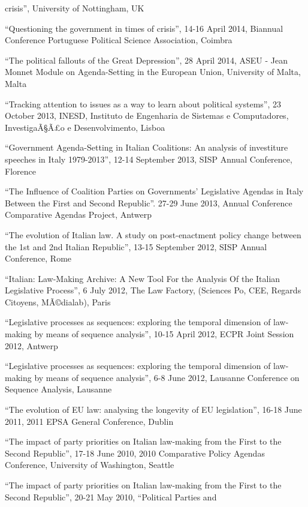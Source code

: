 \documentclass[11pt,]{article}
\renewenvironment{itemize}{
  \begin{list}{}{
    \setlength{\leftmargin}{1.5em}
  }
}{
  \end{list}
}
\begin{document}
\begin{itemize}
  crisis'', University of Nottingham, UK
\item
  ``Questioning the government in times of crisis'', 14-16 April 2014,
  Biannual Conference Portuguese Political Science Association, Coimbra
\item
  ``The political fallouts of the Great Depression'', 28 April 2014,
  ASEU - Jean Monnet Module on Agenda-Setting in the European Union,
  University of Malta, Malta
\item
  ``Tracking attention to issues as a way to learn about political
  systems'', 23 October 2013, INESD, Instituto de Engenharia de Sistemas
  e Computadores, InvestigaÃ§Ã£o e Desenvolvimento, Lisboa
\item
  ``Government Agenda-Setting in Italian Coalitions: An analysis of
  investiture speeches in Italy 1979-2013'', 12-14 September 2013, SISP
  Annual Conference, Florence
\item
  ``The Influence of Coalition Parties on Governments' Legislative
  Agendas in Italy Between the First and Second Republic''. 27-29 June
  2013, Annual Conference Comparative Agendas Project, Antwerp
\item
  ``The evolution of Italian law. A study on post-enactment policy
  change between the 1st and 2nd Italian Republic'', 13-15 September
  2012, SISP Annual Conference, Rome
\item
  ``Italian: Law-Making Archive: A New Tool For the Analysis Of the
  Italian Legislative Process'', 6 July 2012, The Law Factory, (Sciences
  Po, CEE, Regards Citoyens, MÃ©dialab), Paris
\item
  ``Legislative processes as sequences: exploring the temporal dimension
  of law-making by means of sequence analysis'', 10-15 April 2012, ECPR
  Joint Session 2012, Antwerp
\item
  ``Legislative processes as sequences: exploring the temporal dimension
  of law-making by means of sequence analysis'', 6-8 June 2012, Lausanne
  Conference on Sequence Analysis, Lausanne
\item
  ``The evolution of EU law: analysing the longevity of EU
  legislation'', 16-18 June 2011, 2011 EPSA General Conference, Dublin
\item
  ``The impact of party priorities on Italian law-making from the First
  to the Second Republic'', 17-18 June 2010, 2010 Comparative Policy
  Agendas Conference, University of Washington, Seattle
\item
  ``The impact of party priorities on Italian law-making from the First
  to the Second Republic'', 20-21 May 2010, ``Political Parties and

\end{itemize}
\end{document}

